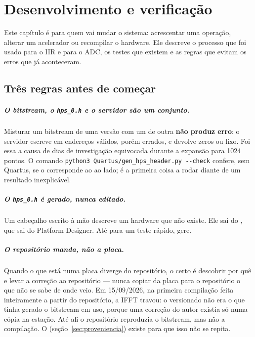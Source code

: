 \chapter{Desenvolvimento e verificação}
\label{cap:desenvolvimento}

Este capítulo é para quem vai mudar o sistema: acrescentar uma operação,
alterar um acelerador ou recompilar o hardware. Ele descreve o processo que foi
usado para o IIR e para o ADC, os testes que existem e as regras que evitam os
erros que já aconteceram.

\section{Três regras antes de começar}

\paragraph{O bitstream, o \texttt{hps\_0.h} e o servidor são um conjunto.}
Misturar um bitstream de uma versão com um  de outra
\textbf{não produz erro}: o servidor escreve em endereços válidos, porém
errados, e devolve zeros ou lixo. Foi essa a causa de dias de investigação
equivocada durante a expansão para 1024 pontos. O comando
\texttt{python3 Quartus/gen\_hps\_header.py -{}-check} confere, sem Quartus, se
o  corresponde ao  ao lado; é a primeira
coisa a rodar diante de um resultado inexplicável.

\paragraph{O \texttt{hps\_0.h} é gerado, nunca editado.} Um cabeçalho escrito à
mão descreve um hardware que não existe. Ele sai do , que sai
do Platform Designer. Até para um teste rápido, gere.

\paragraph{O repositório manda, não a placa.} Quando o que está numa placa
diverge do repositório, o certo é descobrir por quê e levar a correção ao
repositório --- nunca copiar da placa para o repositório o que não se sabe de
onde veio. Em 15/09/2026, na primeira compilação feita inteiramente a partir do
repositório, a IFFT travou: o  versionado não era o que tinha
gerado o bitstream em uso, porque uma correção do autor existia só numa cópia
na estação. Até ali o repositório reproduzia o bitstream, mas não a
compilação. O  (seção~\ref{sec:proveniencia}) existe
para que isso não se repita.

